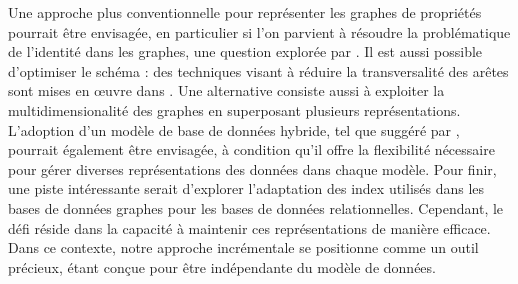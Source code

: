 Une approche plus conventionnelle pour représenter les graphes de propriétés pourrait être envisagée, en particulier si l'on parvient à résoudre la problématique de l'identité dans les graphes, une question explorée par \cite{fanDependenciesGraphs2019}.
Il est aussi possible d'optimiser le schéma : des techniques visant à réduire la transversalité des arêtes sont mises en œuvre dans \cite{alotaibiPropertyGraphSchema2021}.
Une alternative consiste aussi à exploiter la multidimensionalité des graphes en superposant plusieurs représentations.
L'adoption d'un modèle de base de données hybride, tel que suggéré par \cite{hassanGRFusionGraphsFirstClass2018}, pourrait également être envisagée, à condition qu'il offre la flexibilité nécessaire pour gérer diverses représentations des données dans chaque modèle.
Pour finir, une piste intéressante serait d'explorer l'adaptation des index utilisés dans les bases de données graphes pour les bases de données relationnelles.
Cependant, le défi réside dans la capacité à maintenir ces représentations de manière efficace.
Dans ce contexte, notre approche incrémentale se positionne comme un outil précieux, étant conçue pour être indépendante du modèle de données.
